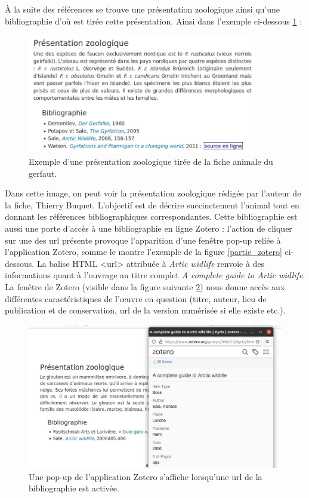 \documentclass[a4paper,12pt,twoside]{book}
\begin{document}
À la suite des références se trouve une présentation zoologique ainsi qu'une bibliographie d'où est tirée cette présentation. Ainsi dans l'exemple ci-dessous \ref{pres_zoo} :

\begin{figure}[H]
    \centering
    \includegraphics[width=10cm]{img/partie_3/pres_zoo.JPG}
    \caption{Exemple d'une présentation zoologique tirée de la fiche animale du gerfaut.}
    \label{pres_zoo}
\end{figure}

Dans cette image, on peut voir la présentation zoologique rédigée par l'auteur de la fiche, Thierry Buquet. L'objectif est de décrire succinctement l'animal tout en donnant les références bibliographiques correspondantes. Cette bibliographie est aussi une porte d'accès à une bibliographie en ligne Zotero : l'action de cliquer sur une des url présente provoque l'apparition d'une fenêtre pop-up reliée à l'application Zotero, comme le montre l'exemple de la figure \ref{partie_zotero} ci-dessous. La balise \acrshort{HTML} <url> attribuée à \textit{Artic widlife} renvoie à des informations quant à l'ouvrage au titre complet \og \textit{A complete guide to Artic widlife}\fg. La fenêtre de Zotero (visible dans la figure suivante \ref{zotero-pop}) nous donne accès aux différentes caractéristiques de l'\oe{}uvre en question (titre, auteur, lieu de publication et de conservation, url de la version numérisée si elle existe etc.).

\begin{figure}[H]
    \centering
    \includegraphics[width=12cm]{img/partie_3/zotero.JPG}
    \caption{Une pop-up de l'application Zotero s'affiche lorsqu'une url de la bibliographie est activée.}
    \label{zotero-pop}
\end{figure}
\end{document}
